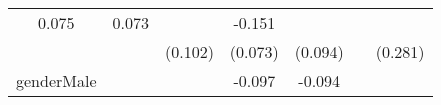 \documentclass[12pt,twoside]{reedthesis}
\begin{document}
\begin{longtable}[]{@{}ccccccc@{}}
\begin{minipage}[t]{0.11\columnwidth}
  0.075\strut
  \end{minipage} & \begin{minipage}[t]{0.11\columnwidth}\centering\strut
  0.073\strut
  \end{minipage} & \begin{minipage}[t]{0.11\columnwidth}\centering\strut
  \strut
  \end{minipage} & \begin{minipage}[t]{0.12\columnwidth}\centering\strut
  -0.151\strut
  \end{minipage}\tabularnewline
  \begin{minipage}[t]{0.14\columnwidth}\centering\strut
  \strut
  \end{minipage} & \begin{minipage}[t]{0.10\columnwidth}\centering\strut
  \strut
  \end{minipage} & \begin{minipage}[t]{0.11\columnwidth}\centering\strut
  (0.102)\strut
  \end{minipage} & \begin{minipage}[t]{0.11\columnwidth}\centering\strut
  (0.073)\strut
  \end{minipage} & \begin{minipage}[t]{0.11\columnwidth}\centering\strut
  (0.094)\strut
  \end{minipage} & \begin{minipage}[t]{0.11\columnwidth}\centering\strut
  \strut
  \end{minipage} & \begin{minipage}[t]{0.12\columnwidth}\centering\strut
  (0.281)\strut
  \end{minipage}\tabularnewline
  \begin{minipage}[t]{0.14\columnwidth}\centering\strut
  genderMale\strut
  \end{minipage} & \begin{minipage}[t]{0.10\columnwidth}\centering\strut
  \strut
  \end{minipage} & \begin{minipage}[t]{0.11\columnwidth}\centering\strut
  \strut
  \end{minipage} & \begin{minipage}[t]{0.11\columnwidth}\centering\strut
  -0.097\strut
  \end{minipage} & \begin{minipage}[t]{0.11\columnwidth}\centering\strut
  -0.094\strut
  \end{minipage} & \begin{minipage}[t]{0.11\columnwidth}\centering\strut

\end{minipage}
\end{longtable}
\end{document}

